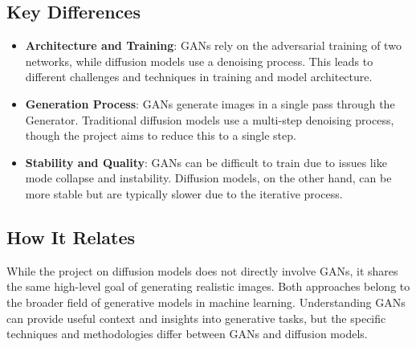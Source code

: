 \documentclass[11pt]{article}
\begin{document}
\subsection{Key Differences}
\begin{itemize}
    \item \textbf{Architecture and Training}: GANs rely on the adversarial training of two networks, while diffusion models use a denoising process. This leads to different challenges and techniques in training and model architecture.
    \item \textbf{Generation Process}: GANs generate images in a single pass through the Generator. Traditional diffusion models use a multi-step denoising process, though the project aims to reduce this to a single step.
    \item \textbf{Stability and Quality}: GANs can be difficult to train due to issues like mode collapse and instability. Diffusion models, on the other hand, can be more stable but are typically slower due to the iterative process.
\end{itemize}

\subsection{How It Relates}
While the project on diffusion models does not directly involve GANs, it shares the same high-level goal of generating realistic images. Both approaches belong to the broader field of generative models in machine learning. Understanding GANs can provide useful context and insights into generative tasks, but the specific techniques and methodologies differ between GANs and diffusion models.


\end{document}
